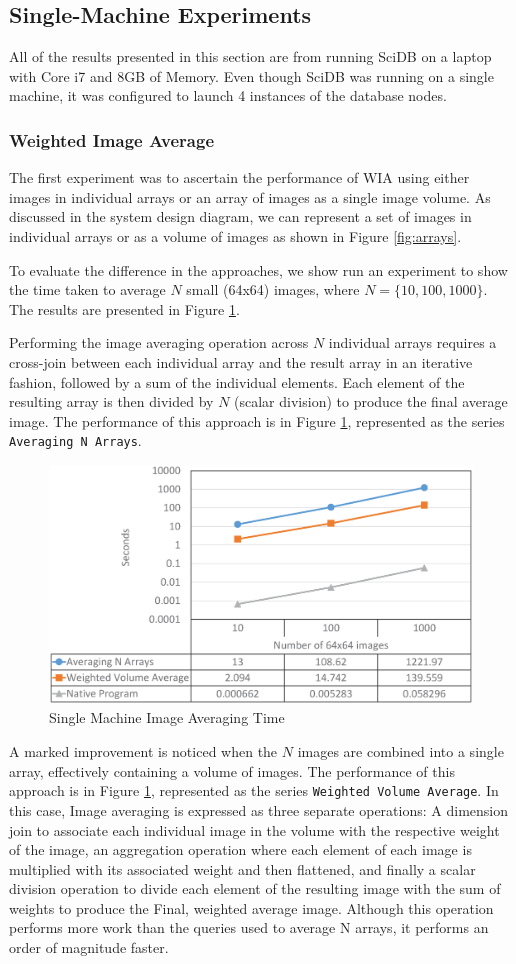 \documentclass[letterpaper,twocolumn,10pt]{article}
\begin{document}
\subsection{Single-Machine Experiments}
All of the results presented in this section are from running SciDB on a laptop with Core i7 and 8GB of Memory. Even though SciDB was running on a single machine, it was configured to launch 4 instances of the database nodes.

\subsubsection{Weighted Image Average}
The first experiment was to ascertain the performance of WIA using either images in individual arrays or an array of images as a single image volume. As discussed in the system design diagram, we can represent a set of images in individual arrays or as a volume of images as shown in Figure \ref{fig:arrays}. 

To evaluate the difference in the approaches, we show run an experiment to show the time taken to average $N$ small (64x64) images, where $N = \{10,100,1000\}$. The results are presented in Figure \ref{fig:avg_result}.

Performing the image averaging operation across $N$ individual arrays requires a cross-join between each individual array and the result array in an iterative fashion, followed by a sum of the individual elements. Each element of the resulting array is then divided by $N$ (scalar division) to produce the final average image. The performance of this approach is in Figure \ref{fig:avg_result}, represented as the series \texttt{Averaging N Arrays}.

\begin{figure}[h]
\centering
\includegraphics[width=.55\textwidth]{figures/wia_single.eps}
\caption{Single Machine Image Averaging Time}
\label{fig:avg_result}
\end{figure}

A marked improvement is noticed when the $N$ images are combined into a single array, effectively containing a volume of images. The performance of this approach is in Figure \ref{fig:avg_result}, represented as the series \texttt{Weighted Volume Average}. In this case, Image averaging is expressed as three separate operations: A dimension join to associate each individual image in the volume with the respective weight of the image, an aggregation operation where each element of each image is multiplied with its associated weight and then flattened, and finally a scalar division operation to divide each element of the resulting image with the sum of weights to produce the Final, weighted average image.  Although this operation performs more work than the queries used to average N arrays, it performs an order of magnitude faster. 
\end{document}
